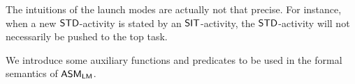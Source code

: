 The intuitions of the launch modes are actually not that precise. For instance, when a new $\mathsf{STD}$-activity is stated by an $\mathsf{SIT}$-activity, the $\mathsf{STD}$-activity will not necessarily be pushed to the top task. 

We introduce some auxiliary functions and predicates to be used in the formal semantics of $\textsf{ASM}_\textsf{LM}$.


